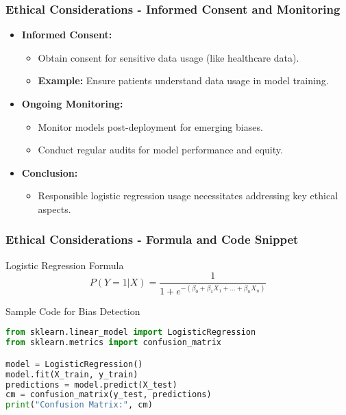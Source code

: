 \documentclass[aspectratio=169]{beamer}
\begin{document}
\begin{frame}[fragile]
    \frametitle{Ethical Considerations - Informed Consent and Monitoring}
    \begin{itemize}
        \item \textbf{Informed Consent:}
            \begin{itemize}
                \item Obtain consent for sensitive data usage (like healthcare data).
                \item \textbf{Example:} Ensure patients understand data usage in model training.
            \end{itemize}
        \item \textbf{Ongoing Monitoring:}
            \begin{itemize}
                \item Monitor models post-deployment for emerging biases.
                \item Conduct regular audits for model performance and equity.
            \end{itemize}
        \item \textbf{Conclusion:}
            \begin{itemize}
                \item Responsible logistic regression usage necessitates addressing key ethical aspects.
            \end{itemize}
    \end{itemize}
\end{frame}

\begin{frame}[fragile]
    \frametitle{Ethical Considerations - Formula and Code Snippet}
    \begin{block}{Logistic Regression Formula}
        \begin{equation}
            P(Y=1 | X) = \frac{1}{1 + e^{-(\beta_0 + \beta_1X_1 + \ldots + \beta_nX_n)}}
        \end{equation}
    \end{block}
    
    \begin{block}{Sample Code for Bias Detection}
        \begin{lstlisting}[language=Python]
from sklearn.linear_model import LogisticRegression
from sklearn.metrics import confusion_matrix

model = LogisticRegression()
model.fit(X_train, y_train)
predictions = model.predict(X_test)
cm = confusion_matrix(y_test, predictions)
print("Confusion Matrix:", cm)
        \end{lstlisting}
    \end{block}
    
\end{frame}
\end{document}
